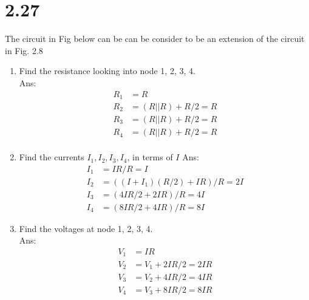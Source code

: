 \documentclass[12pt, a4paper]{article}
\begin{document}
\section{2.27}
The circuit in Fig below can be can be consider to be an extension of the circuit in Fig. 2.8


\begin{enumerate}[label=(\alph*)]
  \item Find the resistance looking into node 1, 2, 3, 4.\\
    Ans: 
    \begin{align*}
      R_1 &= R\\
      R_2 &= (R || R) + R / 2 = R\\
      R_3 &= (R || R) + R / 2 = R\\
      R_4 &= (R || R) + R / 2 = R\\
    \end{align*}
  \item Find the currents $I_1, I_2, I_3, I_4$, in terms of $I$
    Ans:
    \begin{align*}
      I_1 &= IR / R = I\\
      I_2 &= ((I+I_1) (R/2) + IR) / R= 2I\\
      I_3 &= (4IR/2 + 2IR)/R = 4I \\
      I_4 &= (8IR/2 + 4IR)/R = 8I 
    \end{align*}
  \item Find the voltages at node 1, 2, 3, 4.\\
    Ans:
    \begin{align*}
      V_1 &= IR               \\
      V_2 &= V_1 + 2IR/2 = 2IR\\
      V_3 &= V_2 + 4IR/2 = 4IR\\
      V_4 &= V_3 + 8IR/2 = 8IR
    \end{align*}
\end{enumerate}
\end{document}
